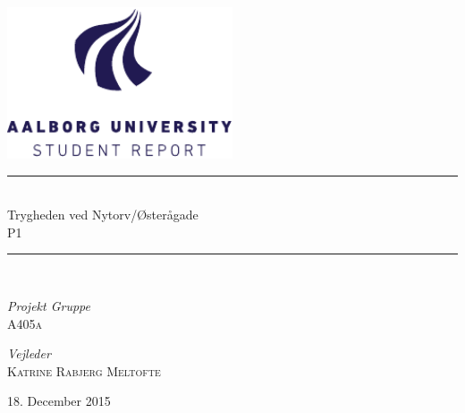 %
%
%
%
%
\begin{titlepage}
	\begin{center}
		\newcommand{\HRule}{\rule{\linewidth}{0.5mm}}

		\includegraphics[width=0.5\textwidth]{figures/aau_logo_en.pdf}~\\[1cm]



		\HRule \\[0.4cm]
		{ \huge Trygheden ved Nytorv/Østerågade\\[0.4cm]
			\large \textsc{P1}}

		\HRule \\[1.5cm]

		\begin{minipage}{0.4\textwidth}
			\begin{flushleft} \large
				\emph{Projekt Gruppe}\\
				\textsc{A405a}
			\end{flushleft}
		\end{minipage}
		\begin{minipage}{0.4\textwidth}
			\begin{flushright} \large
				\emph{Vejleder} \\
				\textsc{Katrine Rabjerg Meltofte}
			\end{flushright}
		\end{minipage}

		\vfill

		{\large 18. December 2015}

	\end{center}
\end{titlepage}

\clearpage
